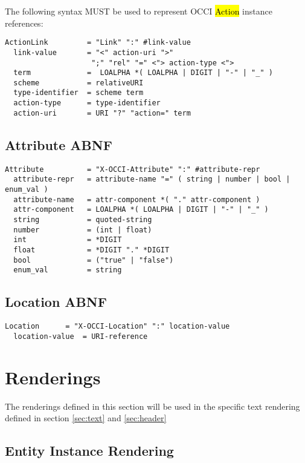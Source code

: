 \documentclass[10pt,a4paper]{article}
\begin{document}
The following syntax MUST be used to represent OCCI \hl{Action}
instance references:

\begin{verbatim}
ActionLink         = "Link" ":" #link-value
  link-value       = "<" action-uri ">"
                    ";" "rel" "=" <"> action-type <">
  term             =  LOALPHA *( LOALPHA | DIGIT | "-" | "_" )
  scheme           = relativeURI
  type-identifier  = scheme term
  action-type      = type-identifier
  action-uri       = URI "?" "action=" term
\end{verbatim}

\subsection{Attribute ABNF}

\begin{verbatim}
Attribute          = "X-OCCI-Attribute" ":" #attribute-repr
  attribute-repr   = attribute-name "=" ( string | number | bool | enum_val )
  attribute-name   = attr-component *( "." attr-component )
  attr-component   = LOALPHA *( LOALPHA | DIGIT | "-" | "_" )
  string           = quoted-string
  number           = (int | float)
  int              = *DIGIT
  float            = *DIGIT "." *DIGIT
  bool             = ("true" | "false")
  enum_val         = string
\end{verbatim}

\subsection{Location ABNF}

\begin{verbatim}
Location      = "X-OCCI-Location" ":" location-value
  location-value  = URI-reference
\end{verbatim}

\section{Renderings}
\label{sec:renderings}

The renderings defined in this section will be used in the specific text rendering defined in section \ref{sec:text} and \ref{sec:header}

\subsection{Entity Instance Rendering}
\end{document}
